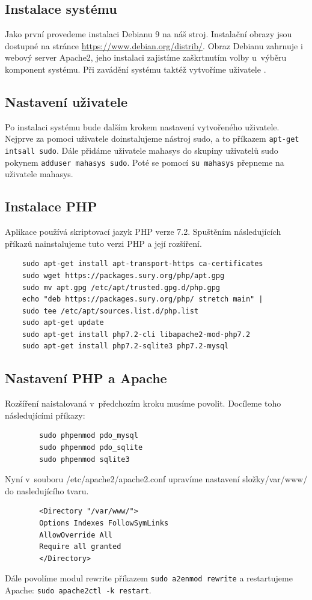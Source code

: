 \documentclass[thesis=B,czech]{FITthesis}[2012/06/26]
\begin{document}
\subsection{Instalace systému}
	Jako první provedeme instalaci Debianu 9 na náš stroj. Instalační obrazy jsou dostupné na stránce \url{https://www.debian.org/distrib/}. Obraz Debianu zahrnuje i webový server Apache2, jeho instalaci zajistíme zaškrtnutím volby  u~výběru komponent systému. Při zavádění systému taktéž vytvoříme uživatele .
\subsection{Nastavení uživatele}
	Po instalaci systému bude dalším krokem nastavení vytvořeného uživatele. Nejprve za pomoci uživatele  doinstalujeme nástroj sudo, a to příkazem \verb|apt-get intsall sudo|. Dále přidáme uživatele mahasys do skupiny uživatelů sudo pokynem \verb|adduser mahasys sudo|. Poté se pomocí \verb|su mahasys| přepneme na uživatele mahasys.
\subsection{Instalace PHP}
	Aplikace používá skriptovací jazyk PHP verze 7.2. Spuštěním následujících příkazů nainstalujeme tuto verzi PHP a její rozšíření.
	\begin{verbatim}
	sudo apt-get install apt-transport-https ca-certificates
	sudo wget https://packages.sury.org/php/apt.gpg
	sudo mv apt.gpg /etc/apt/trusted.gpg.d/php.gpg 
	echo "deb https://packages.sury.org/php/ stretch main" | 
	sudo tee /etc/apt/sources.list.d/php.list
	sudo apt-get update
	sudo apt-get install php7.2-cli libapache2-mod-php7.2
	sudo apt-get install php7.2-sqlite3 php7.2-mysql
	\end{verbatim}
\subsection{Nastavení PHP a Apache}
	Rozšíření naistalovaná v~předchozím kroku musíme povolit. Docíleme toho následujícími příkazy:
	\begin{verbatim}
		sudo phpenmod pdo_mysql
		sudo phpenmod pdo_sqlite
		sudo phpenmod sqlite3
	\end{verbatim}
	Nyní v~souboru /etc/apache2/apache2.conf upravíme nastavení složky\newline/var/www/ do nasledujícího tvaru.
	\begin{verbatim}
		<Directory "/var/www/">
		Options Indexes FollowSymLinks
		AllowOverride All
		Require all granted
		</Directory>
	\end{verbatim}
	Dále povolíme modul rewrite příkazem \verb|sudo a2enmod rewrite| a restartujeme Apache: \verb|sudo apache2ctl -k restart|.
\end{document}
